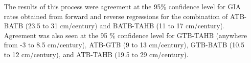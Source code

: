 
 
 The results of this process were agreement at the 95\% confidence level for GIA rates obtained from
 forward and reverse regressions for the combination of ATB-BATB (23.5 to 31 cm/century) and
 BATB-TAHB (11 to 17 cm/century). Agreement was also seen at the 95 \% confidence level for GTB-TAHB (anywhere from -3 to 8.5 cm/century),
 ATB-GTB (9 to 13 cm/century), GTB-BATB (10.5 to 12 cm/century), and ATB-TAHB (19.5 to 29 cm/century).
